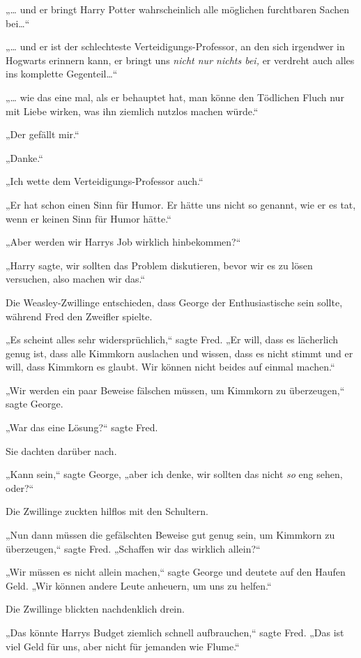 {„… und er bringt Harry Potter wahrscheinlich alle möglichen furchtbaren Sachen bei…“

„… und er ist der schlechteste Verteidigungs-Professor, an den sich irgendwer in Hogwarts erinnern kann, er bringt uns \emph{nicht nur nichts bei,} er verdreht auch alles ins komplette Gegenteil…“

„… wie das eine mal, als er behauptet hat, man könne den Tödlichen Fluch nur mit Liebe wirken, was ihn ziemlich nutzlos machen würde.“

„Der gefällt mir.“

„Danke.“

„Ich wette dem Verteidigungs-Professor auch.“

„Er hat schon einen Sinn für Humor. Er hätte uns nicht so genannt, wie er es tat, wenn er keinen Sinn für Humor hätte.“

„Aber werden wir Harrys Job wirklich hinbekommen?“

„Harry sagte, wir sollten das Problem diskutieren, bevor wir es zu lösen versuchen, also machen wir das.“

Die Weasley-Zwillinge entschieden, dass George der Enthusiastische sein sollte, während Fred den Zweifler spielte.

„Es scheint alles sehr widersprüchlich,“ sagte Fred. „Er will, dass es lächerlich genug ist, dass alle Kimmkorn auslachen und wissen, dass es nicht stimmt und er will, dass Kimmkorn es glaubt. Wir können nicht beides auf einmal machen.“

„Wir werden ein paar Beweise fälschen müssen, um Kimmkorn zu überzeugen,“ sagte George.

„War das eine Lösung?“ sagte Fred.

Sie dachten darüber nach.

„Kann sein,“ sagte George, „aber ich denke, wir sollten das nicht \emph{so} eng sehen, oder?“

Die Zwillinge zuckten hilflos mit den Schultern.

„Nun dann müssen die gefälschten Beweise gut genug sein, um Kimmkorn zu überzeugen,“ sagte Fred. „Schaffen wir das wirklich allein?“

„Wir müssen es nicht allein machen,“ sagte George und deutete auf den Haufen Geld. „Wir können andere Leute anheuern, um uns zu helfen.“

Die Zwillinge blickten nachdenklich drein.

„Das könnte Harrys Budget ziemlich schnell aufbrauchen,“ sagte Fred. „Das ist viel Geld für uns, aber nicht für jemanden wie Flume.“

}
